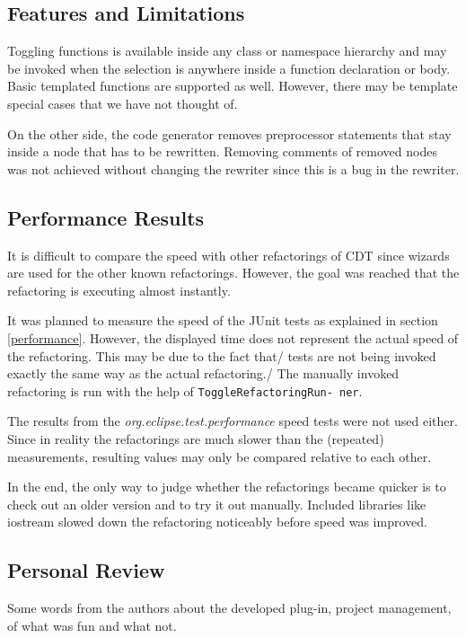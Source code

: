 \subsection{Features and Limitations}

Toggling functions is available inside any class or namespace hierarchy and may 
be invoked when the selection is anywhere inside a function declaration or
body. Basic templated functions are supported as well. However, there may be 
template special cases that we have not thought of.

On the other side, the code generator removes preprocessor statements that stay 
inside a node that has to be rewritten. Removing comments of removed nodes was 
not achieved without changing the rewriter since this is a bug in the rewriter.

\subsection{Performance Results}

It is difficult to compare the speed with other refactorings of CDT since
wizards are used for the other known refactorings. However, the goal was reached
that the refactoring is executing almost instantly.

It was planned to measure the speed of the JUnit tests as explained in section
\ref{performance}. However, the displayed time does not represent the
actual speed of the refactoring. This may be due to the fact that/ tests are not
being invoked exactly the same way as the actual refactoring./ The manually
invoked refactoring is run with the help of \texttt{ToggleRefactoringRun- ner}.

The results from the \textit{org.eclipse.test.performance} speed tests were not 
used either. Since in reality the refactorings are much slower than the 
(repeated) measurements, resulting values may only be compared relative to each 
other.

In the end, the only way to judge whether the refactorings became quicker is to 
check out an older version and to try it out manually. Included libraries like
iostream slowed down the refactoring noticeably before speed was improved.

\subsection{Personal Review}

Some words from the authors about the developed plug-in, project management, of 
what was fun and what not.

